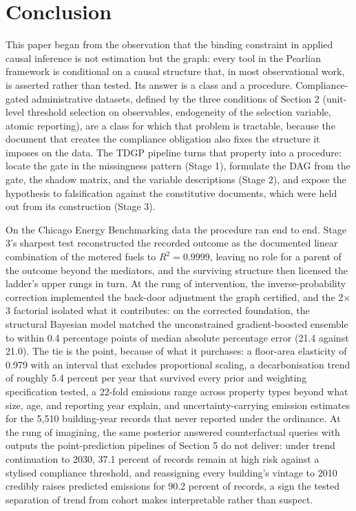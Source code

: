 \FloatBarrier
\section{Conclusion}

This paper began from the observation that the binding constraint in applied causal inference is not estimation but the graph: every tool in the Pearlian framework is conditional on a causal structure that, in most observational work, is asserted rather than tested. Its answer is a class and a procedure. Compliance-gated administrative datasets, defined by the three conditions of Section 2 (unit-level threshold selection on observables, endogeneity of the selection variable, atomic reporting), are a class for which that problem is tractable, because the document that creates the compliance obligation also fixes the structure it imposes on the data. The TDGP pipeline turns that property into a procedure: locate the gate in the missingness pattern (Stage 1), formulate the DAG from the gate, the shadow matrix, and the variable descriptions (Stage 2), and expose the hypothesis to falsification against the constitutive documents, which were held out from its construction (Stage 3).

On the Chicago Energy Benchmarking data the procedure ran end to end. Stage 3's sharpest test reconstructed the recorded outcome as the documented linear combination of the metered fuels to $R^2 = 0.9999$, leaving no role for a parent of the outcome beyond the mediators, and the surviving structure then licensed the ladder's upper rungs in turn. At the rung of intervention, the inverse-probability correction implemented the back-door adjustment the graph certified, and the 2$\times$3 factorial isolated what it contributes: on the corrected foundation, the structural Bayesian model matched the unconstrained gradient-boosted ensemble to within 0.4 percentage points of median absolute percentage error (21.4 against 21.0). The tie is the point, because of what it purchases: a floor-area elasticity of 0.979 with an interval that excludes proportional scaling, a decarbonisation trend of roughly 5.4 percent per year that survived every prior and weighting specification tested, a 22-fold emissions range across property types beyond what size, age, and reporting year explain, and uncertainty-carrying emission estimates for the 5,510 building-year records that never reported under the ordinance. At the rung of imagining, the same posterior answered counterfactual queries with outputs the point-prediction pipelines of Section 5 do not deliver: under trend continuation to 2030, 37.1 percent of records remain at high risk against a stylised compliance threshold, and reassigning every building's vintage to 2010 credibly raises predicted emissions for 90.2 percent of records, a sign the tested separation of trend from cohort makes interpretable rather than suspect.

